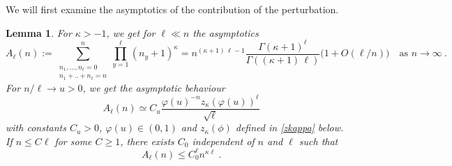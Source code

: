 \documentclass[pdflatex,sn-mathphys-num]{sn-jnl}%
\theoremstyle{thmstyleone}%
\newtheorem{lemma}[theorem]{Lemma}%
\theoremstyle{thmstyletwo}%
\theoremstyle{thmstylethree}%
\begin{document}


\noindent We will first examine the asymptotics of the contribution of the perturbation.

\begin{lemma}
	\label{lemma_sumprod}
	For $\kappa > -1$, we get for $\ell\ll n$ the asymptotics
	\begin{equation*}
		A_\ell(n):=\sum_{\substack{n_1 ,\ldots ,n_\ell =0\\ n_1 +..+n_\ell =n}}^n \prod_{y=1}^\ell(n_y + 1)^\kappa 
			= n^{(\kappa +1) \, \ell - 1} \frac{\Gamma(\kappa +1)^\ell}{\Gamma((\kappa +1) \, \ell)} \big( 1+O(\ell /n)\big)\quad\mbox{as }n\to\infty\ .
	\end{equation*}
For $n/\ell\to u>0$, we get the asymptotic behaviour
\[
A_\ell(n) \simeq C_u \frac{\varphi (u)^{-n} z_\kappa (\varphi (u))^\ell}{\sqrt{\ell }}
\]
with constants $C_u >0$, $\varphi (u)\in (0,1)$ and $z_\kappa (\phi )$ defined in \eqref{zkappa} below.\\
If $n \leq C \ell$ for some $C\geq 1$, there exists $C_0$ independent of $n$ and $\ell$ such that
\begin{equation}\label{finalbound}
   A_\ell(n) \leq C_0^\ell n^{\kappa \ell}\ .
\end{equation}
\end{lemma}
\end{document}
